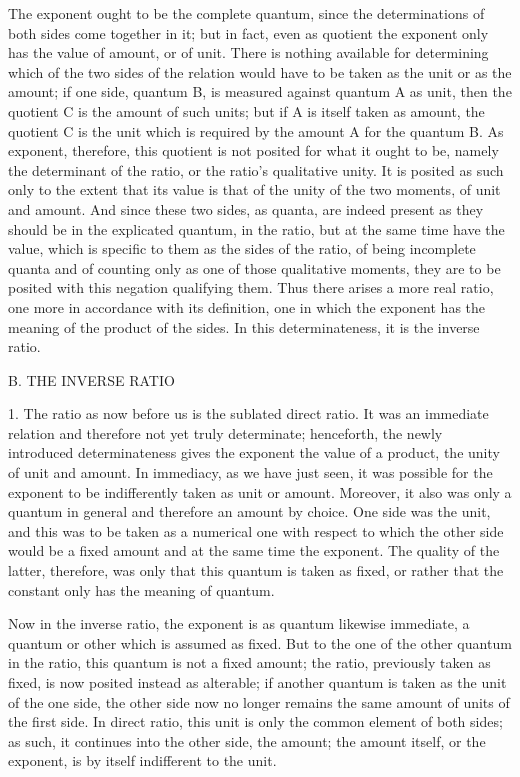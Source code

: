 The exponent ought to be the complete quantum,
since the determinations of both sides come together in it;
but in fact, even as quotient the
exponent only has the value of amount, or of unit.
There is nothing available for determining
which of the two sides of the relation would have to
be taken as the unit or as the amount;
if one side, quantum B,
is measured against quantum A as unit,
then the quotient C is the amount of such units;
but if A is itself taken as amount,
the quotient C is the unit which is required by
the amount A for the quantum B.
As exponent, therefore, this quotient is
not posited for what it ought to be,
namely the determinant of the ratio,
or the ratio's qualitative unity.
It is posited as such only to
the extent that its value is that
of the unity of the two moments,
of unit and amount.
And since these two sides, as quanta,
are indeed present as they should be
in the explicated quantum, in the ratio,
but at the same time have the value,
which is specific to them as the sides of the ratio,
of being incomplete quanta and of counting
only as one of those qualitative moments,
they are to be posited with this negation qualifying them.
Thus there arises a more real ratio,
one more in accordance with its definition,
one in which the exponent has the meaning of the product of the sides.
In this determinateness, it is the inverse ratio.

B. THE INVERSE RATIO

1. The ratio as now before us is the sublated direct ratio.
It was an immediate relation and therefore not yet truly determinate;
henceforth, the newly introduced determinateness gives
the exponent the value of a product,
the unity of unit and amount.
In immediacy, as we have just seen,
it was possible for the exponent to be
indifferently taken as unit or amount.
Moreover, it also was only a quantum in general
and therefore an amount by choice.
One side was the unit,
and this was to be taken as a numerical one
with respect to which the other side would be a fixed amount
and at the same time the exponent.
The quality of the latter, therefore,
was only that this quantum is taken as fixed,
or rather that the constant only
has the meaning of quantum.

Now in the inverse ratio,
the exponent is as quantum likewise immediate,
a quantum or other which is assumed as fixed.
But to the one of the other quantum in the ratio,
this quantum is not a fixed amount; the ratio,
previously taken as fixed, is now posited instead as alterable;
if another quantum is taken as
the unit of the one side,
the other side now no longer remains
the same amount of units of the first side.
In direct ratio, this unit
is only the common element of both sides;
as such, it continues into the other side, the amount;
the amount itself, or the exponent,
is by itself indifferent to the unit.

